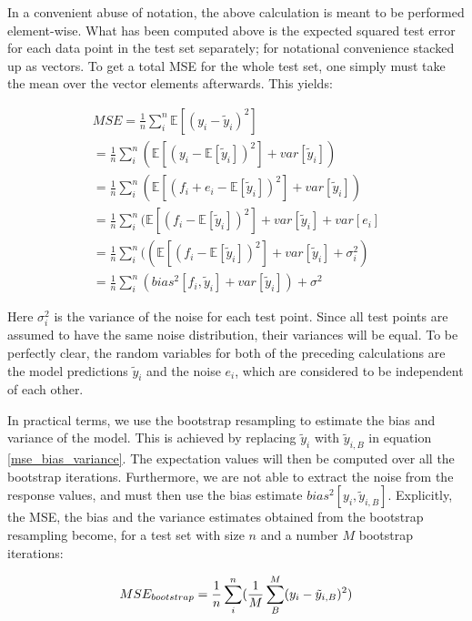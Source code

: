 \documentclass[reprint, english, nofootinbib]{revtex4-2}
\begin{document}
In a convenient abuse of notation, the above calculation is meant to be performed element-wise. What has been computed above is the expected squared test error for each data point in the test set separately; for notational convenience stacked up as vectors. To get a total MSE for the whole test set, one simply must take the mean over the vector elements afterwards. This yields:

\begin{equation}
\label{mse_bias_variance}
\begin{split}
MSE = \frac{1}{n} \sum^{n}_{i} \mathbb{E} [(y_{i} - \tilde{y}_{i})^2]  \\
= \frac{1}{n} \sum^{n}_{i} (\mathbb{E}[(y_{i} - \mathbb{E}[\tilde{y}_{i}])^2]+var[\tilde{y}_{i}]) \\
= \frac{1}{n} \sum^{n}_{i} (\mathbb{E}[(f_{i} + e_{i} - \mathbb{E}[\tilde{y}_{i}])^2] + var[\tilde{y}_{i}]) \\
= \frac{1}{n} \sum^{n}_{i} (\mathbb{E}[(f_{i} - \mathbb{E}[\tilde{y}_{i}])^2] + var[\tilde{y}_{i}] + var[e_{i}] \\
= \frac{1}{n} \sum^{n}_{i} ((\mathbb{E}[(f_{i} - \mathbb{E}[\tilde{y}_{i}])^2] + var[\tilde{y}_{i}] + \sigma_{i}^2) \\
=  \frac{1}{n} \sum^{n}_{i} (bias^2[f_i,\tilde{y}_{i}] + var[\tilde{y}_{i}]) + \sigma^2
\end{split}
\end{equation}

Here $\sigma_{i}^2$ is the variance of the noise for each test point. Since all test points are assumed to have the same noise distribution, their variances will be equal.  To be perfectly clear, the random variables for both of the preceding calculations are the model predictions $\tilde{y}_{i}$ and the noise $e_{i}$, which are considered to be independent of each other.

In practical terms, we use the bootstrap resampling to estimate the bias and variance of the model. This is achieved by replacing $\tilde{y}_{i}$ with $\tilde{y}_{i,B}$ in equation \ref{mse_bias_variance}. The expectation values will then be computed over all the bootstrap iterations. Furthermore, we are not able to extract the noise from the response values, and must then use the bias estimate $bias^2[y_{i},\tilde{y}_{i,B}]$. Explicitly, the MSE, the bias and the variance estimates obtained from the bootstrap resampling become, for a test set with size $n$ and a number $M$ bootstrap iterations:

\begin{equation}
\label{bootstrap_mse}
MSE_{bootstrap} = \frac{1}{n} \sum^{n}_{i} (\frac{1}{M}\sum^{M}_{B} (y_{i} - \tilde{y}_{i,B})^2)  \\
\end{equation}
\end{document}
